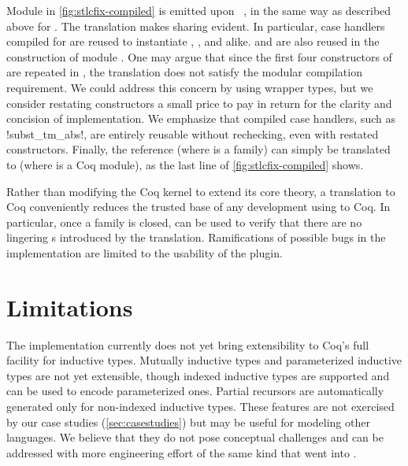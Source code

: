 Module  in \cref{fig:stlcfix-compiled} is emitted upon
~, in the same way as described above for .
The translation makes sharing evident.
In particular, case handlers compiled for 
are reused to instantiate , , and alike.
 and 
are also reused in the construction of module .
%
One may argue that since the first four constructors of  are
repeated in , the translation does not satisfy the
modular compilation requirement.
We could address this concern by using wrapper types,
but we consider restating constructors a small price to pay in return
for the clarity and concision of implementation.
We emphasize that compiled case handlers, such as \lsti!subst\_tm_abs!,
are entirely reusable without rechecking, even with restated constructors.
%
Finally, the reference  (where  is a family)
can simply be translated to  (where  is a Coq module),
as the last line of \cref{fig:stlcfix-compiled} shows.


Rather than modifying the Coq kernel to extend its core theory, a translation to
Coq conveniently reduces the trusted base of any development using \Lang to Coq.
In particular, once a family is closed,  can be used
to verify that there are no lingering s introduced by the translation.
Ramifications of possible bugs in the \Lang implementation are limited to
the usability of the plugin.


\section{Limitations}
\label{sec:limitations}

The \Lang implementation currently does not yet bring extensibility to Coq's full
facility for inductive types.
Mutually inductive types and parameterized inductive types are not yet extensible,
though indexed inductive types are supported and can be used to encode parameterized ones.
Partial recursors are automatically generated only for non-indexed inductive types.
These features are not exercised by our case studies (\cref{sec:casestudies})
but may be useful for modeling other languages.
We believe that they do not pose conceptual challenges and can be
addressed with more engineering effort of the same kind that went into \Lang.

